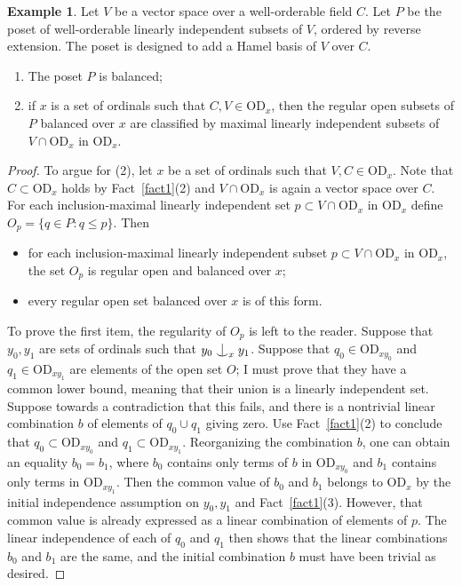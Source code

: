 \documentclass{article}
\newcommand{\vd}{\mathrm{OD}}
\newcommand{\forkindep}[1][]{%
  \mathrel{
    \mathop{
      \vcenter{
        \hbox{\oalign{\noalign{\kern-.3ex}\hfil$\vert$\hfil\cr
              \noalign{\kern-.7ex}
              $\smile$\cr\noalign{\kern-.3ex}}}
      }
    }\displaylimits_{#1}
  }
}
\theoremstyle{definition}
\newtheorem{example}[theorem]{Example}
\begin{document}
\begin{example}
\label{linearexample}
Let $V$ be a vector space over a well-orderable field $C$. Let $P$ be the poset of well-orderable linearly independent subsets of $V$, ordered by reverse extension. The poset is designed to add a Hamel basis of $V$ over $C$.

\begin{enumerate}
\item The poset $P$ is balanced;
\item if $x$ is a set of ordinals such that $C, V\in\vd_x$, then the regular open subsets of $P$ balanced over $x$ are classified by maximal linearly independent subsets of $V\cap\vd_x$ in $\vd_x$.
\end{enumerate}
\end{example}

\begin{proof}
To argue for (2), let $x$ be a set of ordinals such that $V, C\in\vd_x$. Note that $C\subset\vd_x$ holds by Fact~\ref{fact1}(2) and $V\cap\vd_x$ is again a vector space over $C$. For each inclusion-maximal linearly independent set $p\subset V\cap\vd_x$ in $\vd_x$ define $O_p=\{q\in P\colon q\leq p\}$. Then

\begin{itemize}
\item for each inclusion-maximal linearly independent subset $p\subset V\cap\vd_x$ in $\vd_x$, the set $O_p$ is regular open and balanced over $x$;
\item every regular open set balanced over $x$ is of this form.
\end{itemize}

To prove the first item, the regularity of $O_p$ is left to the reader. Suppose that $y_0, y_1$ are sets of ordinals such that $y_0\forkindep[x]y_1$. Suppose that $q_0\in\vd_{xy_0}$ and $q_1\in\vd_{xy_1}$ are elements of the open set $O$; I must prove that they have a common lower bound, meaning that their union is a linearly independent set. Suppose towards a contradiction that this fails, and there is a nontrivial linear combination $b$ of elements of $q_0\cup q_1$ giving zero. Use Fact~\ref{fact1}(2) to conclude that $q_0\subset\vd_{xy_0}$ and $q_1\subset\vd_{xy_1}$. Reorganizing the combination $b$, one can obtain an equality $b_0=b_1$, where $b_0$ contains only terms of $b$ in $\vd_{xy_0}$ and $b_1$ contains only terms in $\vd_{xy_1}$. Then the common value of $b_0$ and $b_1$ belongs to $\vd_x$ by the initial independence assumption on $y_0, y_1$ and Fact~\ref{fact1}(3). However, that common value is already expressed as a linear combination of elements of $p$. The linear independence of each of $q_0$ and $q_1$ then shows that the linear combinations $b_0$ and $b_1$ are the same, and the initial combination $b$ must have been trivial as desired.


\end{proof}
\end{document}
